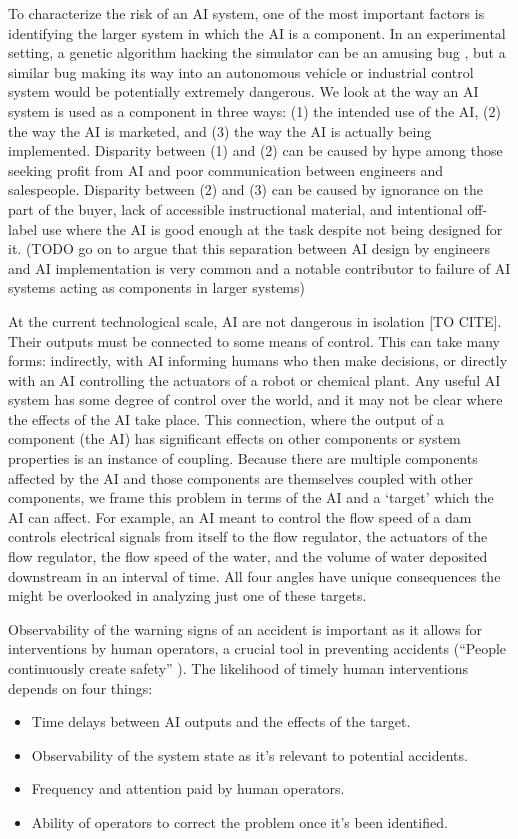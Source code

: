 \documentclass[11pt]{article}
\begin{document}
To characterize the risk of an AI system, one of the most important factors is identifying the
larger system in which the AI is a component. In an experimental setting, a genetic algorithm
hacking the simulator can be an amusing bug \cite{lehman2018surprising}, but a similar bug making
its way into an autonomous vehicle or industrial control system would be potentially extremely
dangerous. We look at the way an AI system is used as a component in three ways: (1) the intended
use of the AI, (2) the way the AI is marketed, and (3) the way the AI is actually being implemented.
Disparity between (1) and (2) can be caused by hype among those seeking profit from AI and poor
communication between engineers and salespeople. Disparity between (2) and (3) can be caused by
ignorance on the part of the buyer, lack of accessible instructional material, and intentional
off-label use where the AI is good enough at the task despite not being designed for it. (TODO go on
to argue that this separation between AI design by engineers and AI implementation is very common
and a notable contributor to failure of AI systems acting as components in larger systems)

At the current technological scale, AI are not dangerous in isolation [TO CITE]. Their outputs must
be connected to some means of control. This can take many forms: indirectly, with AI informing humans
who then make decisions, or directly with an AI controlling the actuators of a robot or chemical
plant. Any useful AI system has some degree of control over the world, and it may not be clear where
the effects of the AI take place. This connection, where the output of a component (the AI) has
significant effects on other components or system properties is an instance of coupling. Because
there are multiple components affected by the AI and those components are themselves coupled with
other components, we frame this problem in terms of the AI and a `target' which the AI can affect.
For example, an AI meant to control the flow speed of a dam controls electrical signals from itself
to the flow regulator, the actuators of the flow regulator, the flow speed of the water, and the
volume of water deposited downstream in an interval of time. All four angles have unique
consequences the might be overlooked in analyzing just one of these targets.

Observability of the warning signs of an accident is important as it allows for interventions by
human operators, a crucial tool in preventing accidents (``People continuously create safety''
\cite{cook1998complex}). The likelihood of timely human interventions depends on four things:
\begin{itemize}
    \item Time delays between AI outputs and the effects of the target.
    \item Observability of the system state as it's relevant to potential accidents.
    \item Frequency and attention paid by human operators.
    \item Ability of operators to correct the problem once it's been identified.
\end{itemize}
\end{document}
